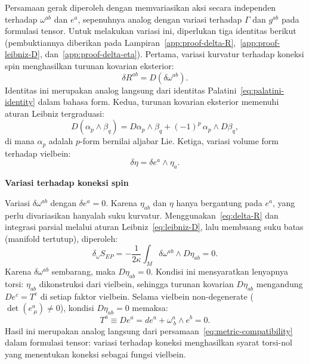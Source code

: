 Persamaan gerak diperoleh dengan memvariasikan aksi secara independen terhadap $\omega^{ab}$ dan $e^a$, sepenuhnya analog dengan variasi terhadap $\Gamma$ dan $g^{ab}$ pada formulasi tensor. Untuk melakukan variasi ini, diperlukan tiga identitas berikut (pembuktiannya diberikan pada Lampiran~\ref{app:proof-delta-R},~\ref{app:proof-leibniz-D}, dan~\ref{app:proof-delta-eta}). Pertama, variasi kurvatur terhadap koneksi spin menghasilkan turunan kovarian eksterior:
\begin{equation}\label{eq:delta-R}
    \delta R^{ab} = D(\delta\omega^{ab}).
\end{equation}
Identitas ini merupakan analog langsung dari identitas Palatini~\eqref{eq:palatini-identity} dalam bahasa form. Kedua, turunan kovarian eksterior memenuhi aturan Leibniz tergraduasi:
\begin{equation}\label{eq:leibniz-D}
    D(\alpha_p \wedge \beta_q) = D\alpha_p \wedge \beta_q + (-1)^p\, \alpha_p \wedge D\beta_q,
\end{equation}
di mana $\alpha_p$ adalah $p$-form bernilai aljabar Lie. Ketiga, variasi volume form terhadap vielbein:
\begin{equation}\label{eq:delta-eta}
    \delta\eta = \delta e^a \wedge \eta_a.
\end{equation}

\vspace{0.5em}
\noindent \textbf{Variasi terhadap koneksi spin}

Variasi $\delta\omega^{ab}$ dengan $\delta e^a = 0$. Karena $\eta_{ab}$ dan $\eta$ hanya bergantung pada $e^a$, yang perlu divariasikan hanyalah suku kurvatur. Menggunakan~\eqref{eq:delta-R} dan integrasi parsial melalui aturan Leibniz~\eqref{eq:leibniz-D}, lalu membuang suku batas (manifold tertutup), diperoleh:
\begin{equation}
    \delta_\omega S_{EP} = -\frac{1}{2\kappa}\int_M \delta\omega^{ab} \wedge D\eta_{ab} = 0.
\end{equation}
Karena $\delta\omega^{ab}$ sembarang, maka $D\eta_{ab} = 0$. Kondisi ini mensyaratkan lenyapnya torsi: $\eta_{ab}$ dikonstruksi dari vielbein, sehingga turunan kovarian $D\eta_{ab}$ mengandung $De^c = T^c$ di setiap faktor vielbein. Selama vielbein non-degenerate ($\det(e^a_{\ \mu}) \neq 0$), kondisi $D\eta_{ab} = 0$ memaksa:
\begin{equation}\label{eq:torsion-free-general}
    T^a \equiv De^a = de^a + \omega^a_{\ b} \wedge e^b = 0.
\end{equation}
Hasil ini merupakan analog langsung dari persamaan~\eqref{eq:metric-compatibility} dalam formulasi tensor: variasi terhadap koneksi menghasilkan syarat torsi-nol yang menentukan koneksi sebagai fungsi vielbein.

